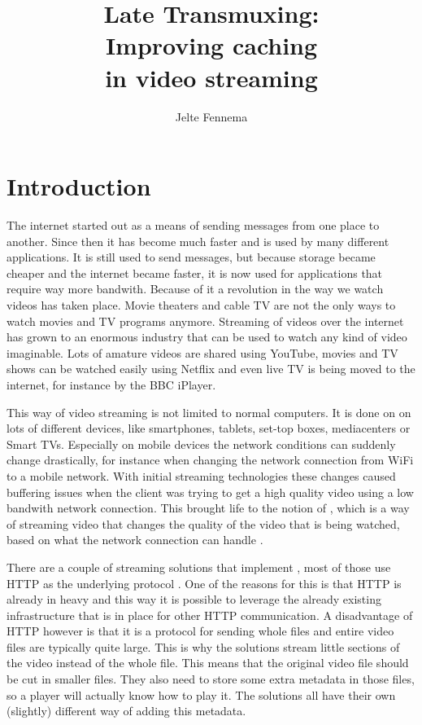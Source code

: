 \documentclass[twoside,openright]{uva-bachelor-thesis}
\title{Late Transmuxing:\\Improving caching \\in video streaming}
\author{Jelte Fennema}
\begin{document}
\maketitle

\begin{abstract}
\end{abstract}


\tableofcontents

\chapter{Introduction}
The internet started out as a means of sending messages from one place to
another. Since then it has become much faster and is used by many different
applications. It is still used to send messages, but because storage became
cheaper and the internet became faster, it is now used for applications that
require way more bandwith. Because of it a revolution in the way we watch videos
has taken place. Movie theaters and cable TV are not the only ways to watch
movies and TV programs anymore. Streaming of videos over the internet has grown
to an enormous industry that can be used to watch any kind of video imaginable.
Lots of amature videos are shared using YouTube, movies and TV shows can be
watched easily using Netflix and even live TV is being moved to the internet,
for instance by the BBC iPlayer.

This way of video streaming is not limited to normal computers. It is done on on
lots of different devices, like smartphones, tablets, set-top boxes,
mediacenters or Smart TVs. Especially on mobile devices the network conditions
can suddenly change drastically, for instance when changing the network
connection from WiFi to a mobile network. With initial streaming technologies
these changes caused buffering issues when the client was trying to get a high
quality video using a low bandwith network connection. This brought life to the
notion of \abs, which is a way of streaming video that changes the quality
of the video that is being watched, based on what the network connection can
handle \autocite{abs}.

There are a couple of streaming solutions that implement \abs, most of
those use HTTP as the underlying protocol \autocite{http}.  One of the reasons
for this is that HTTP is already in heavy and this way it is possible to
leverage the already existing infrastructure that is in place for other HTTP
communication. A disadvantage of HTTP however is that it is a protocol for
sending whole files and entire video files are typically quite large. This is
why the solutions stream little sections of the video instead of the whole file.
This means that the original video file should be cut in smaller files. They
also need to store some extra metadata in those files, so a player will actually
know how to play it. The solutions all have their own (slightly) different way
of adding this metadata.
\end{document}
